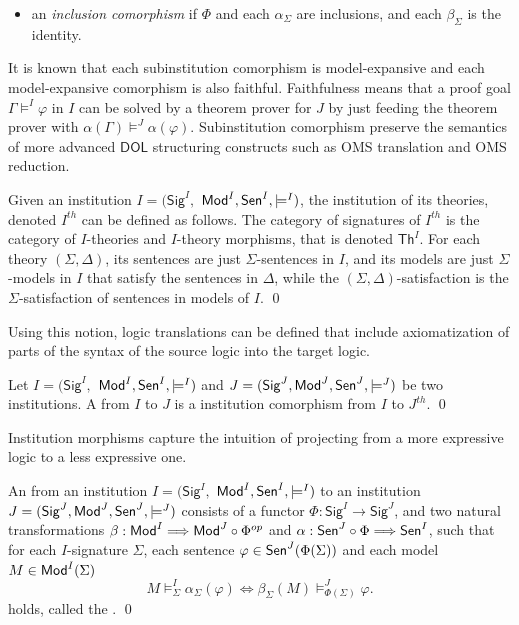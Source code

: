 \documentclass[10pt,fleqn,final]{scrreprt}
\newcommand{\Sig}{\mathsf{Sig}}
\renewcommand{\Th}{\mathsf{Th}}
\newcommand*{\DOL}{\ensuremath{\mathsf{DOL}}\xspace}
\newenvironment{definitions}[0]{\medskip }{}
\begin{document}
\begin{definitions}
\begin{itemize}
\item an \emph{inclusion comorphism} if 
        $\Phi$ and each $\alpha_\Sigma$ are inclusions, and each
        $\beta_\Sigma$ is the identity.
  
\end{itemize}

It is known that each subinstitution comorphism is model-expansive and 
each model-expansive comorphism
is also faithful.
Faithfulness means that a proof goal $\Gamma\models^I\varphi$
in $I$ can be solved by a theorem prover for $J$ by just feeding the
theorem prover with $\alpha(\Gamma)\models^J\alpha(\varphi)$.
Subinstitution comorphism preserve
the semantics of more advanced \DOL structuring constructs such
as OMS translation and OMS reduction.


\begin{definition}
  Given an institution  $I = (\Sig^I,$ $ \mathsf{Mod}^I, \mathsf{Sen}^I, \models^I)$, the
   institution of its theories, denoted $I^{th}$ can be defined as follows. The category of signatures of $I^{th}$ is the category
   of $I$-theories and $I$-theory morphisms, that  is denoted $\Th^I$.
   For each theory $(\Sigma, \Delta)$, its sentences are just $\Sigma$-sentences in $I$, and
   its models are just $\Sigma$-models in $I$ that satisfy the sentences in $\Delta$, while the
   $(\Sigma,\Delta)$-satisfaction is the $\Sigma$-satisfaction of sentences in models of $I$.
\qed \end{definition}

Using this notion, logic translations can be defined that include axiomatization of parts of the
syntax of the source logic into the target logic.

\begin{definition}

 Let $I = (\Sig^I,$ $ \mathsf{Mod}^I, \mathsf{Sen}^I, \models^I)$ and $J = (\Sig^J, \Mod^J,
\Sen^J, \models^J)$ be two institutions. A  from $I$ to
$J$ is a institution comorphism from $I$ to $J^{th}$.
\qed\end{definition}

\medskip

Institution morphisms capture the intuition of projecting from a more expressive logic to a less expressive one.

\begin{definition} 
An  from an institution $I = (\Sig^I,$ $ \mathsf{Mod}^I, \mathsf{Sen}^I, \models^I)$ to
an institution $J = (\Sig^J, \Mod^J,
\Sen^J, \models^J)$ consists of a functor $\Phi : \Sig^I \longrightarrow \Sig^J$, and two
natural transformations $\beta: \mathsf{Mod}^I \Longrightarrow \mathsf{Mod}^J \circ \Phi^{op}$
and $\alpha:  \mathsf{Sen}^J \circ \Phi \Longrightarrow \mathsf{Sen}^I $, such that for each $I$-signature $\Sigma$, each sentence $\varphi\in\mathsf{Sen}^J(\Phi(\Sigma))$ and each model $M\in\mathsf{Mod}^I(\Sigma)$
$$ M\models^{I}_{\Sigma}\alpha_{\Sigma}(\varphi) \Leftrightarrow
\beta_{\Sigma}(M)\models^J_{\Phi(\Sigma)}\varphi.
$$
holds, called the .
\qed\end{definition}


\end{definitions}
\end{document}
